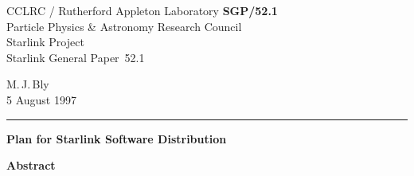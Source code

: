 \documentclass[twoside,11pt]{article}
\newcommand{\stardoccategory}  {Starlink General Paper}
\newcommand{\stardocinitials}  {SGP}
\newcommand{\stardocnumber}    {52.1}
\newcommand{\stardocauthors}   {M.\,J.\,Bly}
\newcommand{\stardocdate}      {5 August 1997}
\newcommand{\stardoctitle}     {Plan for Starlink Software Distribution}
\newcommand{\stardocname}{\stardocinitials /\stardocnumber}
\newenvironment{latexonly}{}{}
\begin{document}
\thispagestyle{empty}

\begin{latexonly}
   CCLRC / {\sc Rutherford Appleton Laboratory} \hfill {\bf \stardocname}\\
   {\large Particle Physics \& Astronomy Research Council}\\
   {\large Starlink Project\\}
   {\large \stardoccategory\ \stardocnumber}
   \begin{flushright}
   \stardocauthors\\
   \stardocdate
   \end{flushright}
   \vspace{-4mm}
   \rule{\textwidth}{0.5mm}
   \vspace{5mm}
   \begin{center}
   {\Large\bf \stardoctitle}
   \end{center}
   \vspace{5mm}

   \vspace{10mm}
   \begin{center}
      {\Large\bf Abstract}
   \end{center}
\end{latexonly}
\end{document}

